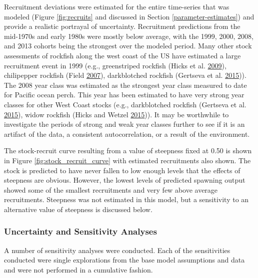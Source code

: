 \documentclass[12pt,]{article}
\begin{document}
Recruitment deviations were estimated for the entire time-series that
was modeled (Figure \ref{fig:recruits} and discussed in Section
\ref{parameter-estimates}) and provide a realistic portrayal of
uncertainty. Recruitment predictions from the mid-1970s and early 1980s
were mostly below average, with the 1999, 2000, 2008, and 2013 cohorts
being the strongest over the modeled period. Many other stock
assessments of rockfish along the west coast of the US have estimated a
large recruitment event in 1999 (e.g., greenstriped rockfish (Hicks et
al. \protect\hyperlink{ref-hicks_status_2009}{2009}), chilipepper
rockfish (Field \protect\hyperlink{ref-field_status_2007}{2007}),
darkblotched rockfish (Gertseva et al.
\protect\hyperlink{ref-gertseva_status_2015}{2015})). The 2008 year
class was estimated as the strongest year class measured to date for
Pacific ocean perch. This year has been estimated to have very strong
year classes for other West Coast stocks (e.g., darkblotched rockfish
(Gertseva et al. \protect\hyperlink{ref-gertseva_status_2015}{2015}),
widow rockfish (Hicks and Wetzel
\protect\hyperlink{ref-hicks_status_2015}{2015})). It may be worthwhile
to investigate the periods of strong and weak year classes further to
see if it is an artifact of the data, a consistent autocorrelation, or a
result of the environment.

The stock-recruit curve resulting from a value of steepness fixed at
0.50 is shown in Figure \ref{fig:stock_recruit_curve} with estimated
recruitments also shown. The stock is predicted to have never fallen to
low enough levels that the effects of steepness are obvious. However,
the lowest levels of predicted spawning output showed some of the
smallest recruitments and very few above average recruitments. Steepness
was not estimated in this model, but a sensitivity to an alternative
value of steepness is discussed below.

\subsubsection{Uncertainty and Sensitivity
Analyses}\label{uncertainty-and-sensitivity-analyses}

A number of sensitivity analyses were conducted. Each of the
sensitivities conducted were single explorations from the base model
assumptions and data and were not performed in a cumulative fashion.
\end{document}
